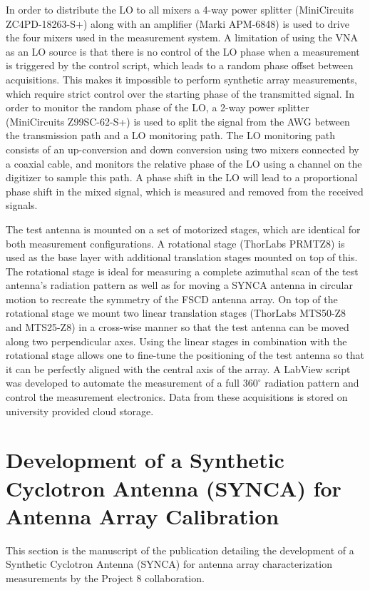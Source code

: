 In order to distribute the LO to all mixers a 4-way power splitter (MiniCircuits ZC4PD-18263-S+) along with an amplifier (Marki APM-6848) is used to drive the four mixers used in the measurement system. A limitation of using the VNA as an LO source is that there is no control of the LO phase when a measurement is triggered by the control script, which leads to a random phase offset between acquisitions. This makes it impossible to perform synthetic array measurements, which require strict control over the starting phase of the transmitted signal. In order to monitor the random phase of the LO, a 2-way power splitter (MiniCircuits Z99SC-62-S+) is used to split the signal from the AWG between the transmission path and a LO monitoring path. The LO monitoring path consists of an up-conversion and down conversion using two mixers connected by a coaxial cable, and monitors the relative phase of the LO using a channel on the digitizer to sample this path. A phase shift in the LO will lead to a proportional phase shift in the mixed signal, which is measured and removed from the received signals.

The test antenna is mounted on a set of motorized stages, which are identical for both measurement configurations. A rotational stage (ThorLabs PRMTZ8) is used as the base layer with additional translation stages mounted on top of this. The rotational stage is ideal for measuring a complete azimuthal scan of the test antenna's radiation pattern as well as for moving a SYNCA antenna in circular motion to recreate the symmetry of the FSCD antenna array. On top of the rotational stage we mount two linear translation stages (ThorLabs MTS50-Z8 and MTS25-Z8) in a cross-wise manner so that the test antenna can be moved along two perpendicular axes. Using the linear stages in combination with the rotational stage allows one to fine-tune the positioning of the test antenna so that it can be perfectly aligned with the central axis of the array. A LabView script was developed to automate the measurement of a full $360^\circ$ radiation pattern and control the measurement electronics. Data from these acquisitions is stored on university provided cloud storage.

\section{Development of a Synthetic Cyclotron Antenna (SYNCA) for Antenna Array Calibration}
\label{sec:SYNCA}
This section is the manuscript of the publication \cite{p8synca} detailing the development of a Synthetic Cyclotron Antenna (SYNCA) for antenna array characterization measurements by the Project 8 collaboration. 

